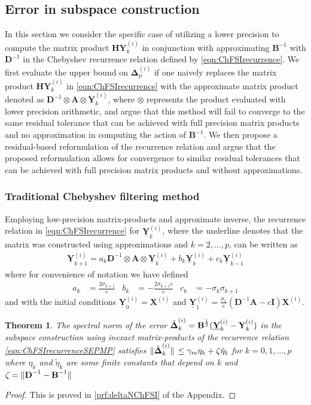 \documentclass[preprint,3p,number,sort&compress]{elsarticle}
\newtheorem{theorem}{Theorem}[section]
\newcommand{\bA}{\textbf{A}}
\newcommand{\bB}{\textbf{B}}
\newcommand{\bD}{\textbf{D}}
\newcommand{\bH}{\textbf{H}}
\newcommand{\bI}{\textbf{I}}
\newcommand{\bX}{\textbf{X}}
\newcommand{\bY}{\textbf{Y}}
\newcommand{\bDelta}{\boldsymbol{\Delta}}
\DeclarePairedDelimiter\norm{\lVert}{\rVert\,}%
\begin{document}
\subsection{Error in subspace construction}
In this section we consider the specific case of utilizing a lower precision to compute the matrix product $\bH\bY^{(i)}_k$ in conjunction with approximating $\bB^{-1}$ with $\bD^{-1}$ in the Chebyshev recurrence relation defined by \cref{eqn:ChFSIrecurrence}. We first evaluate the upper bound on $\bDelta_p^{(i)}$ if one naively replaces the matrix product $\bH\bY^{(i)}_k$ in \cref{eqn:ChFSIrecurrence} with the approximate matrix product denoted as ${\bD^{-1}\otimes\bA\otimes\bY^{(i)}_k}$, where $\otimes$ represents the product evaluated with lower precision arithmetic, and argue that this method will fail to converge to the same residual tolerance that can be achieved with full precision matrix products and no approximation in computing the action of $\bB^{-1}$. We then propose a residual-based reformulation of the recurrence relation and argue that the proposed reformulation allows for convergence to similar residual tolerances that can be achieved with full precision matrix products and without approximations.

\subsubsection{Traditional Chebyshev filtering method}
Employing low-precision matrix-products and approximate inverse, the recurrence relation in \cref{eqn:ChFSIrecurrence} for $\underline{\bY}^{(i)}_k$, where the underline denotes that the matrix was constructed using approximations and $k=2,\dots,p$, can be written as
\begin{align}
 \underline{\bY}_{k+1}^{(i)}=a_k{\bD^{-1}\otimes\bA\otimes\underline{\bY}_k^{(i)}}+b_k\underline{\bY}_k^{(i)}+c_k\underline{\bY}_{k-1}^{(i)}\label{eqn:ChFSIrecurrenceSEPMP}
\end{align}
where for convenience of notation we have defined
\begin{align*}
  a_k&=\frac{2\sigma_{k+1}}{e}&b_k&=-\frac{2\sigma_{k+1}c}{e}&c_k&=-\sigma_k\sigma_{k+1}
\end{align*}
and with the initial conditions $\underline{\bY}_0^{(i)}=\bX^{(i)}$ and $\underline{\bY}_1^{(i)}=\frac{\sigma_1}{e}(\bD^{-1}\bA-c\bI)\bX^{(i)}$. 

\begin{theorem}
 \label{thm:deltaNChFSI}
 The spectral norm of the error $\normalfont\hat{\bDelta}_k^{(i)}=\bB^{\frac{1}{2}}(\underline{\bY}_k^{(i)}-\bY_k^{(i)})$ in the subspace construction using inexact matrix-products of the recurrence relation \cref{eqn:ChFSIrecurrenceSEPMP} satisfies $\normalfont\norm{\hat{\bDelta}_k^{(i)}}\leq\gamma_m\eta_k+\zeta\tilde{\eta}_k$ for $k=0,1,\dots,p$ where $\eta_k$ and $\tilde{\eta}_k$ are some finite constants that depend on $k$ and $\normalfont\zeta=\norm{\bD^{-1}-\bB^{-1}}$
\end{theorem}
\begin{proof}
This is proved in \cref{prf:deltaNChFSI} of the Appendix.
\end{proof}
\end{document}
